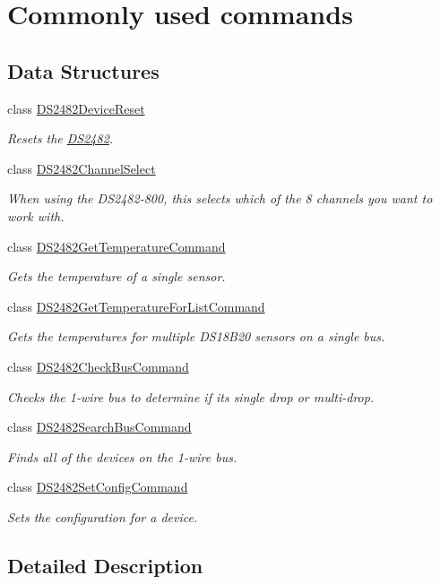 \hypertarget{group___commands}{}\section{Commonly used commands}
\label{group___commands}
\subsection*{Data Structures}
\begin{DoxyCompactItemize}
\item 
class \mbox{\hyperlink{class_d_s2482_device_reset}{D\+S2482\+Device\+Reset}}
\begin{DoxyCompactList}\small\item\em Resets the \mbox{\hyperlink{class_d_s2482}{D\+S2482}}. \end{DoxyCompactList}\item 
class \mbox{\hyperlink{class_d_s2482_channel_select}{D\+S2482\+Channel\+Select}}
\begin{DoxyCompactList}\small\item\em When using the D\+S2482-\/800, this selects which of the 8 channels you want to work with. \end{DoxyCompactList}\item 
class \mbox{\hyperlink{class_d_s2482_get_temperature_command}{D\+S2482\+Get\+Temperature\+Command}}
\begin{DoxyCompactList}\small\item\em Gets the temperature of a single sensor. \end{DoxyCompactList}\item 
class \mbox{\hyperlink{class_d_s2482_get_temperature_for_list_command}{D\+S2482\+Get\+Temperature\+For\+List\+Command}}
\begin{DoxyCompactList}\small\item\em Gets the temperatures for multiple D\+S18\+B20 sensors on a single bus. \end{DoxyCompactList}\item 
class \mbox{\hyperlink{class_d_s2482_check_bus_command}{D\+S2482\+Check\+Bus\+Command}}
\begin{DoxyCompactList}\small\item\em Checks the 1-\/wire bus to determine if it\textquotesingle{}s single drop or multi-\/drop. \end{DoxyCompactList}\item 
class \mbox{\hyperlink{class_d_s2482_search_bus_command}{D\+S2482\+Search\+Bus\+Command}}
\begin{DoxyCompactList}\small\item\em Finds all of the devices on the 1-\/wire bus. \end{DoxyCompactList}\item 
class \mbox{\hyperlink{class_d_s2482_set_config_command}{D\+S2482\+Set\+Config\+Command}}
\begin{DoxyCompactList}\small\item\em Sets the configuration for a device. \end{DoxyCompactList}\end{DoxyCompactItemize}


\subsection{Detailed Description}
